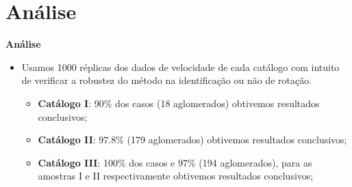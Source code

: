 \documentclass[xcolor=dvipsnames,10pt]{beamer}
\begin{document}
\section{Análise}
\begin{frame}{\textbf{Análise}}
  \begin{itemize}
      \item Usamos 1000 réplicas dos dados de velocidade de cada catálogo com intuito de verificar a robustez do método na identificação ou não de rotação.
      \begin{itemize}
        \item \textbf{Catálogo I}: 90\% dos casos (18 aglomerados) obtivemos resultados conclusivos;
        \item \textbf{Catálogo II}: 97.8\% (179 aglomerados) obtivemos resultados conclusivos;
        \item \textbf{Catálogo III}: 100\% dos casos e 97\% (194 aglomerados), para as amostras I e II respectivamente obtivemos resultados conclusivos;
      \end{itemize}
    \end{itemize}
\end{frame}
\end{document}
